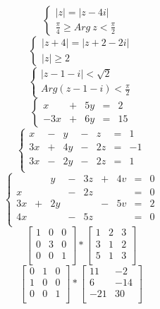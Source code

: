 \documentclass[a4paper]{article}
\begin{document}
$$
\begin{cases}
|z| = |z-4i|\\
\frac{\pi}{4}\geq Arg \ z < \frac{\pi}{2}
\end{cases}
$$
\newline
$$
\begin{cases}
|z+4| = |z+2-2i|\\
|z|\geq 2
\end{cases}
$$
\newline
$$
\begin{cases}
|z-1-i| < \sqrt{2}\\
Arg(z-1-i) < \frac{\pi}{2}
\end{cases}
$$
\newline
$$
\left\{
\begin{array}{rlllr}
x & + & 5y & = & 2\\
-3x & + & 6y & = & 15
\end{array}
\right.
$$
\newline
$$
\left\{
\begin{array}{rrrrrrr}
x & - & y & - & z & = & 1 \\
3x & + & 4y & - & 2z & = & -1\\
3x & - & 2y & - & 2z & = & 1\\
\end{array}
\right.
$$
\newline
$$
\left\{
\begin{array}{rrrrrrrrr}
 &  & y & - & 3z & + & 4v & = & 0 \\
x & & & - & 2z &  &  & = & 0\\
3x & + & 2y & & & - & 5v & = & 2\\
4x & & & - & 5z & & & = & 0\\
\end{array}
\right.
$$
\newline
$$
\left[ \begin{array}{ccc}
1 & 0 & 0 \\
0 & 3 & 0 \\
0 & 0 & 1 \\
\end{array} \right]
*
\left[ \begin{array}{ccc}
1 & 2 & 3 \\
3 & 1 & 2 \\
5 & 1 & 3 \\
\end{array} \right]
$$
\newline
$$
\left[ \begin{array}{ccc}
0 & 1 & 0 \\
1 & 0 & 0 \\
0 & 0 & 1 \\
\end{array} \right]
*
\left[ \begin{array}{cc}
11 & -2 \\
6 & -14 \\
-21 & 30 \\
\end{array} \right]
$$
\end{document}
